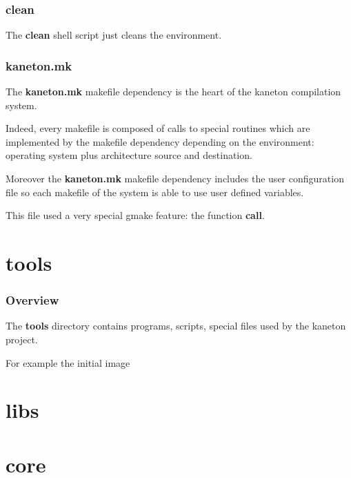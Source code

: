 \documentclass[8pt]{beamer}
\newcommand{\nl}[0]{\vspace{0.4cm}}
\begin{document}

\begin{frame}
  \frametitle{clean}

  The \textbf{clean} shell script just cleans the environment.
\end{frame}


\begin{frame}
  \frametitle{kaneton.mk}

  The \textbf{kaneton.mk} makefile dependency is the heart of the
  kaneton compilation system.

  \nl

  Indeed, every makefile is composed of calls to special routines
  which are implemented by the makefile dependency depending on the
  environment: operating system plus architecture source and destination.

  \nl

  Moreover the \textbf{kaneton.mk} makefile dependency includes the
  user configuration file so each makefile of the system is able to
  use user defined variables.

  \nl

  This file used a very special gmake feature: the function \textbf{call}.
\end{frame}

%
%

\section{tools}


\begin{frame}
  \frametitle{Overview}

  The \textbf{tools} directory contains programs, scripts, special
  files used by the kaneton project.

  \nl

  For example the initial image
\end{frame}

%
%

\section{libs}

%
%

\section{core}
\end{document}
